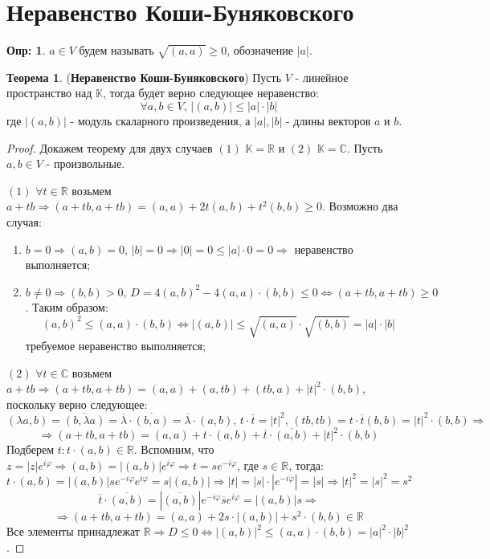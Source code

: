 \documentclass[12pt]{article}
\newcommand{\MR}{\mathbb{R}}
\newcommand{\MC}{\mathbb{C}}
\newcommand{\MK}{\mathbb{K}}
\theoremstyle{definition}
\newtheorem{defn}{Опр:}
\newtheorem{theorem}{Теорема}
\begin{document}

\section*{Неравенство Коши-Буняковского}
\begin{defn}
	 $a \in V$ будем называть $\sqrt{(a,a)} \geq 0$, обозначение $|a|$.
\end{defn}
\begin{theorem}(\textbf{Неравенство Коши-Буняковского})
	Пусть $V$ - линейное пространство над $\MK$, тогда будет верно следующее неравенство:
	$$
		\forall a,b \in V, \, |(a,b)| \leq |a|{\cdot}|b|
	$$ 
	где $|(a,b)|$ - модуль скаларного произведения, а $|a|, |b|$ - длины векторов $a$ и $b$.
\end{theorem}
\begin{proof}
	Докажем теорему для двух случаев $(1)$ $\MK = \MR$ и $(2)$ $\MK = \MC$. Пусть $a,b \in V$ - произвольные.
	
	$(1)$ $\forall t \in \MR$ возьмем $a + tb \Rightarrow (a + tb, a + tb) = (a,a) + 2t(a,b) + t^2(b,b) \geq 0$. Возможно два случая:
	\begin{enumerate}[label=\alph*)]
		\item $b = 0 \Rightarrow (a,b) = 0, \, |b| = 0 \Rightarrow |0| = 0 \leq |a|{\cdot}0 = 0 \Rightarrow$ неравенство выполняется;
		\item $b \neq 0 \Rightarrow (b,b) > 0, \, D = 4(a,b)^2 - 4(a,a){\cdot}(b,b) \leq 0 \Leftrightarrow (a + tb, a + tb) \geq 0$. Таким образом:
		$$
			(a,b)^2 \leq (a,a){\cdot}(b,b) \Leftrightarrow |(a,b)| \leq \sqrt{(a,a)}{\cdot}\sqrt{(b,b)} = |a|{\cdot}|b|
		$$
		требуемое неравенство выполняется;
	\end{enumerate}

	$(2)$ $\forall t \in \MC$ возьмем $a + tb \Rightarrow (a + tb, a + tb) = (a,a) + (a,tb) + (tb,a) + |t|^2{\cdot}(b,b)$, поскольку верно следующее:
	$$
		(\lambda a,b) = \overline{(b,\lambda a)} = \overline{\lambda}{\cdot}\overline{(b,a)} = \overline{\lambda}{\cdot}(a,b), \, t{\cdot}\overline{t} = |t|^2, \, (tb,tb) = t{\cdot}\overline{t}(b,b) = |t|^2{\cdot}(b,b) \Rightarrow
	$$
	$$
		\Rightarrow (a + tb, a + tb) = (a,a) + t{\cdot}(a,b) + \overline{t}{\cdot}\overline{(a,b)} + |t|^2{\cdot}(b,b)
	$$
	Подберем $t \colon t{\cdot}(a,b) \in \MR$. Вспомним, что $z = |z|e^{i\varphi} \Rightarrow (a,b) = |(a,b)|e^{i\varphi} \Rightarrow t = se^{-i\varphi}$, где $s \in \MR$, тогда:
	$$
		t{\cdot}(a,b) = |(a,b)|se^{-i\varphi}e^{i\varphi} = s|(a,b)| \Rightarrow |t| = |s|{\cdot}|e^{-i\varphi}| = |s| \Rightarrow |t|^2 = |s|^2 = s^2
	$$
	$$
		\overline{t}{\cdot}\overline{(a,b)} =|\overline{(a,b)}|e^{-i\varphi}\overline{s}e^{i\varphi} = |(a,b)|s		\Rightarrow
	$$
	$$
		\Rightarrow (a + tb, a + tb) = (a,a) + 2s{\cdot}|(a,b)| + s^2{\cdot}(b,b) \in \MR
	$$
	Все элементы принадлежат $\MR \Rightarrow D \leq 0 \Leftrightarrow |(a,b)|^2 \leq (a,a){\cdot}(b,b) = |a|^2{\cdot}|b|^2$.
\end{proof}
\end{document}
